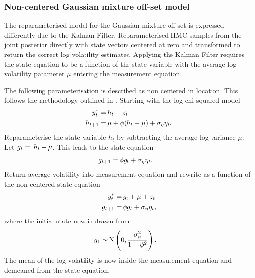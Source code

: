 \documentclass[12pt, a4paper]{article}
\begin{document}
        \subsubsection{Non-centered Gaussian mixture off-set model}
        The reparameterised model for the Gaussian mixture off-set is expressed differently due to the Kalman Filter. Reparameterised HMC samples from the joint posterior directly with state vectors centered at zero and transformed to return the correct log volatility estimates. Applying the Kalman Filter requires the state equation to be a function of the state variable with the average log volatility parameter $\mu$ entering the measurement equation.

        The following parameterisation is described as non centered in location. This follows the methodology outlined in \citet{strickland2008parameterisation}. Starting with the log chi-squared model
        \begin{align}
        y^{\ast}_t =& \space \, h_t + z_t \\
        h_{t+1} =& \space \, \mu +\phi(h_t - \mu) + \sigma_{\eta} \eta_t.
        \end{align}
        Reparameterise the state variable $h_t$ by subtracting the average log variance $\mu$. Let $g_t = \space \, h_t - \mu$. This leads to the state equation
        \begin{align}
        g_{t+1} =& \space \, \phi g_t + \sigma_{\eta}\eta_{t}.
        \end{align}
        Return average volatility into measurement equation and rewrite as a function of the non centered state equation
        \begin{align}
        y^{\ast}_t =& \space \, g_t + \mu + z_t \\
        g_{t+1} =& \space \, \phi g_t + \sigma_{\eta}\eta_{t},
        \end{align}
        where the initial state now is drawn from 
        \begin{align}
            g_1 \sim& \space \,\mathrm{N}\left(0, \frac{\sigma_{\eta}^2}{1-\phi^2}\right).
        \end{align}
        The mean of the log volatility is now inside the measurement equation and demeaned from the state equation.
    
\end{document}
